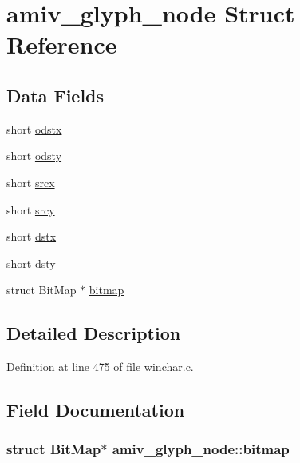\hypertarget{structamiv__glyph__node}{\section{amiv\+\_\+glyph\+\_\+node Struct Reference}
\label{structamiv__glyph__node}
}
\subsection*{Data Fields}
\begin{DoxyCompactItemize}
\item 
short \hyperlink{structamiv__glyph__node_a01d08c786e450b313545f99bcc9b7cb9}{odstx}
\item 
short \hyperlink{structamiv__glyph__node_ab1e73e6143c4515249068a242593f5bc}{odsty}
\item 
short \hyperlink{structamiv__glyph__node_af363a9798dc6d9c868059dea9aac6398}{srcx}
\item 
short \hyperlink{structamiv__glyph__node_a3c3e769de0818636664ba218715b9371}{srcy}
\item 
short \hyperlink{structamiv__glyph__node_a42565a3c855ecf34f2cd47a3af3249b1}{dstx}
\item 
short \hyperlink{structamiv__glyph__node_ada857f1baefdc0ec033c8380ee8b1a4f}{dsty}
\item 
struct Bit\+Map $\ast$ \hyperlink{structamiv__glyph__node_ab11ba30936a2417158aebe7f52a016c7}{bitmap}
\end{DoxyCompactItemize}


\subsection{Detailed Description}


Definition at line 475 of file winchar.\+c.



\subsection{Field Documentation}
\hypertarget{structamiv__glyph__node_ab11ba30936a2417158aebe7f52a016c7}{
\subsubsection[{bitmap}]{\setlength{\rightskip}{0pt plus 5cm}struct Bit\+Map$\ast$ amiv\+\_\+glyph\+\_\+node\+::bitmap}}\label{structamiv__glyph__node_ab11ba30936a2417158aebe7f52a016c7}


